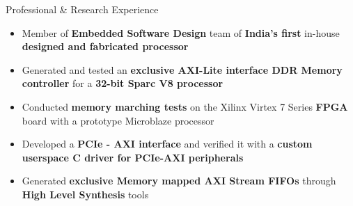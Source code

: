 \documentclass{resume}
\newcommand{\sepval}{-0.5em}
\begin{document}
\begin{rSection}{Professional \& Research Experience}
\begin{itemize}[leftmargin=*]
	\itemsep \sepval

	\item Member of {\bf Embedded Software Design} team of {\bf India's first} in-house {\bf designed and fabricated processor}
	
	\item Generated and tested an {\bf exclusive AXI-Lite interface DDR
		Memory controller} for a {\bf 32-bit Sparc V8 processor}
	      
	\item Conducted {\bf memory marching tests} on the Xilinx Virtex 7 Series {\bf FPGA} board with a prototype Microblaze processor
	
	\item Developed a {\bf PCIe - AXI interface} and verified it with a {\bf
		custom userspace C driver for PCIe-AXI peripherals}

	\item Generated {\bf exclusive Memory mapped AXI Stream FIFOs} through {\bf High Level Synthesis} tools

\end{itemize}

\end{rSection}
\end{document}
